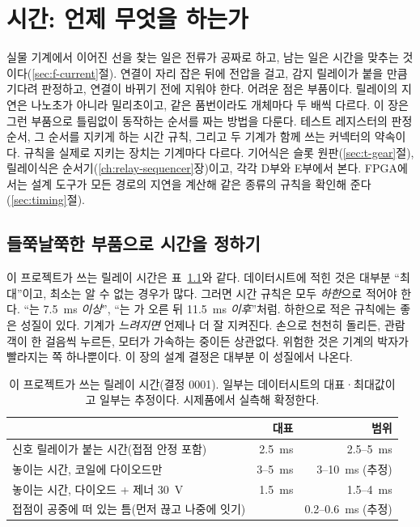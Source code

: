 \chapter{시간: 언제 무엇을 하는가}\label{ch:relay-timing}

실물 기계에서 이어진 선을 찾는 일은 전류가 공짜로 하고, 남는 일은 시간을 맞추는 것이다(\ref{sec:f-current}절).
연결이 자리 잡은 뒤에 전압을 걸고, 감지 릴레이가 붙을 만큼 기다려 판정하고, 연결이 바뀌기 전에 지워야 한다.
어려운 점은 부품이다. 릴레이의 지연은 나노초가 아니라 밀리초이고, 같은 품번이라도 개체마다 두 배씩 다르다.
이 장은 그런 부품으로 틀림없이 동작하는 순서를 짜는 방법을 다룬다. 테스트 레지스터의 판정 순서, 그 순서를
지키게 하는 시간 규칙, 그리고 두 기계가 함께 쓰는 커넥터의 약속이다. 규칙을 실제로 지키는 장치는 기계마다
다르다. 기어식은 슬롯 원판(\ref{sec:t-gear}절), 릴레이식은 순서기(\ref{ch:relay-sequencer}장)이고, 각각 D부와
E부에서 본다. FPGA에서는 설계
도구가 모든 경로의 지연을 계산해 같은 종류의 규칙을 확인해 준다(\ref{sec:timing}절).

\section{들쭉날쭉한 부품으로 시간을 정하기}\label{sec:t-bounds}

\Why 이 프로젝트가 쓰는 릴레이 시간은 표~\ref{tab:t-relay}와 같다. 데이터시트에 적힌 것은 대부분 ``최대''이고,
최소는 알 수 없는 경우가 많다. 그러면 시간 규칙은 모두 \emph{하한}으로 적어야 한다. ``는 7.5~ms
\emph{이상}'', ``는 가 오른 뒤 11.5~ms \emph{이후}''처럼. 하한으로 적은 규칙에는 좋은
성질이 있다. 기계가 \emph{느려지면} 언제나 더 잘 지켜진다. 손으로 천천히 돌리든, 관람객이 한 걸음씩
누르든, 모터가 가속하는 중이든 상관없다. 위험한 것은 기계의 박자가 빨라지는 쪽 하나뿐이다. 이 장의 설계 결정은 대부분 이
성질에서 나온다.

\begin{table}[ht]
\centering
\caption{이 프로젝트가 쓰는 릴레이 시간(결정 0001). 일부는 데이터시트의 대표·최대값이고 일부는 추정이다.
시제품에서 실측해 확정한다.}
\label{tab:t-relay}
\small
\begin{tabular}{lrr}
\toprule
& 대표 & 범위 \\
\midrule
신호 릴레이가 붙는 시간(접점 안정 포함) & 2.5~ms & 2.5--5~ms \\
놓이는 시간, 코일에 다이오드만 & 3--5~ms & 3--10~ms (추정) \\
놓이는 시간, 다이오드 + 제너 30~V & 1.5~ms & 1.5--4~ms \\
접점이 공중에 떠 있는 틈(먼저 끊고 나중에 잇기) & & 0.2--0.6~ms (추정) \\
\bottomrule
\end{tabular}
\end{table}

